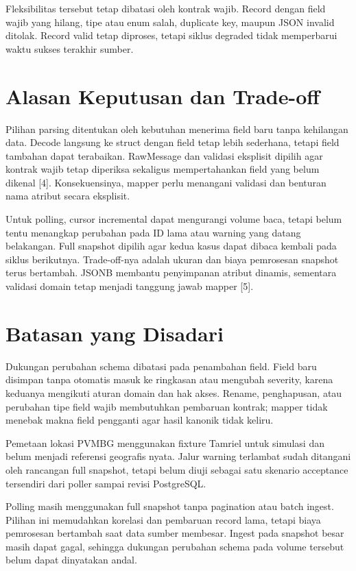 Fleksibilitas tersebut tetap dibatasi oleh kontrak wajib. Record dengan field wajib yang hilang, tipe atau enum salah, duplicate key, maupun JSON invalid ditolak. Record valid tetap diproses, tetapi siklus degraded tidak memperbarui waktu sukses terakhir sumber.

\section{Alasan Keputusan dan Trade-off}
Pilihan parsing ditentukan oleh kebutuhan menerima field baru tanpa kehilangan data. Decode langsung ke struct dengan field tetap lebih sederhana, tetapi field tambahan dapat terabaikan. RawMessage dan validasi eksplisit dipilih agar kontrak wajib tetap diperiksa sekaligus mempertahankan field yang belum dikenal [4]. Konsekuensinya, mapper perlu menangani validasi dan benturan nama atribut secara eksplisit.

Untuk polling, cursor incremental dapat mengurangi volume baca, tetapi belum tentu menangkap perubahan pada ID lama atau warning yang datang belakangan. Full snapshot dipilih agar kedua kasus dapat dibaca kembali pada siklus berikutnya. Trade-off-nya adalah ukuran dan biaya pemrosesan snapshot terus bertambah. JSONB membantu penyimpanan atribut dinamis, sementara validasi domain tetap menjadi tanggung jawab mapper [5].

\section{Batasan yang Disadari}
Dukungan perubahan schema dibatasi pada penambahan field. Field baru disimpan tanpa otomatis masuk ke ringkasan atau mengubah severity, karena keduanya mengikuti aturan domain dan hak akses. Rename, penghapusan, atau perubahan tipe field wajib membutuhkan pembaruan kontrak; mapper tidak menebak makna field pengganti agar hasil kanonik tidak keliru.

Pemetaan lokasi PVMBG menggunakan fixture Tamriel untuk simulasi dan belum menjadi referensi geografis nyata. Jalur warning terlambat sudah ditangani oleh rancangan full snapshot, tetapi belum diuji sebagai satu skenario acceptance tersendiri dari poller sampai revisi PostgreSQL.

Polling masih menggunakan full snapshot tanpa pagination atau batch ingest. Pilihan ini memudahkan korelasi dan pembaruan record lama, tetapi biaya pemrosesan bertambah saat data sumber membesar. Ingest pada snapshot besar masih dapat gagal, sehingga dukungan perubahan schema pada volume tersebut belum dapat dinyatakan andal.

